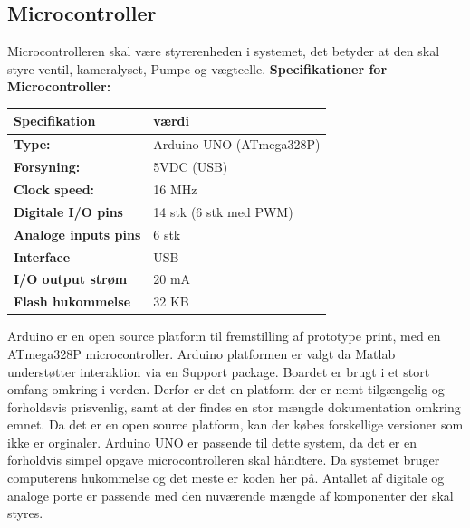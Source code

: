 \subsection{Microcontroller}
Microcontrolleren skal være styrerenheden i systemet, det betyder at den skal styre ventil, kameralyset, Pumpe og vægtcelle.  
\textbf{Specifikationer for Microcontroller:} 
\begin{center}
		\begin{longtable}{ | m{6.5cm} | m{6.5cm}| } 
			\hline
			\textbf{Specifikation} &\textbf{værdi} \\ 
			\hline
			\textbf{Type:} & Arduino UNO (ATmega328P) \\ 
			\hline
			\textbf{Forsyning:} & 5VDC (USB)  \\ 
			\hline
			\textbf{Clock speed:} & 16 MHz  \\ 
			\hline		
			\textbf{Digitale I/O pins} & 14 stk (6 stk med PWM)  \\ 
			\hline	
			\textbf{Analoge inputs pins} & 6 stk  \\ 
			\hline	
			\textbf{Interface} & USB  \\ 
			\hline	
			\textbf{I/O output strøm} & 20 mA  \\ 
			\hline
			\textbf{Flash hukommelse} & 32 KB  \\ 
			\hline	
		\end{longtable}
\end{center}
Arduino er en open source platform til fremstilling af prototype print, med en ATmega328P microcontroller. Arduino platformen er valgt da Matlab understøtter interaktion via en Support package. Boardet er brugt i et stort omfang omkring i verden. Derfor er det en platform der er nemt tilgængelig og forholdsvis prisvenlig, samt at der findes en stor mængde dokumentation omkring emnet. Da det er en open source platform, kan der købes forskellige versioner som ikke er orginaler. Arduino UNO er passende til dette system, da det er en forholdvis simpel opgave microcontrolleren skal håndtere. Da systemet bruger computerens hukommelse og det meste er koden her på. Antallet af digitale og analoge porte er passende med den nuværende mængde af komponenter der skal styres. 

